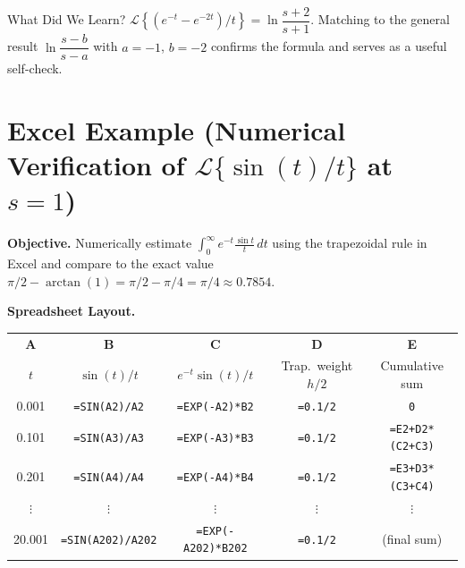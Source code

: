 \documentclass[12pt,a4paper]{article}
\begin{document}
\begin{learnbox}{What Did We Learn?}
$\mathcal{L}\!\left\{(e^{-t}-e^{-2t})/t\right\} = \ln\dfrac{s+2}{s+1}$.
Matching to the general result $\ln\dfrac{s-b}{s-a}$ with $a=-1$, $b=-2$
confirms the formula and serves as a useful self-check.
\end{learnbox}

\section{Excel Example (Numerical Verification of
         \texorpdfstring{$\mathcal{L}\{\sin(t)/t\}$}{L{sin(t)/t}} at $s=1$)}

\textbf{Objective.}\;
Numerically estimate $\displaystyle\int_0^\infty e^{-t}\frac{\sin t}{t}\,dt$
using the trapezoidal rule in Excel and compare to the exact value
$\pi/2 - \arctan(1) = \pi/2 - \pi/4 = \pi/4 \approx 0.7854$.

\medskip
\noindent\textbf{Spreadsheet Layout.}

\begin{center}
\begin{tabular}{@{}ccccc@{}}
\toprule
\textbf{A} & \textbf{B} & \textbf{C} & \textbf{D} & \textbf{E} \\
$t$ & $\sin(t)/t$ & $e^{-t}\sin(t)/t$ & Trap.\ weight $h/2$ & Cumulative sum \\
\midrule
0.001 & \texttt{=SIN(A2)/A2} & \texttt{=EXP(-A2)*B2} & \texttt{=0.1/2} & \texttt{0} \\
0.101 & \texttt{=SIN(A3)/A3} & \texttt{=EXP(-A3)*B3} & \texttt{=0.1/2} & \texttt{=E2+D2*(C2+C3)} \\
0.201 & \texttt{=SIN(A4)/A4} & \texttt{=EXP(-A4)*B4} & \texttt{=0.1/2} & \texttt{=E3+D3*(C3+C4)} \\
$\vdots$ & $\vdots$ & $\vdots$ & $\vdots$ & $\vdots$ \\
20.001 & \texttt{=SIN(A202)/A202} & \texttt{=EXP(-A202)*B202} & \texttt{=0.1/2} & (final sum) \\
\bottomrule
\end{tabular}
\end{center}
\end{document}
